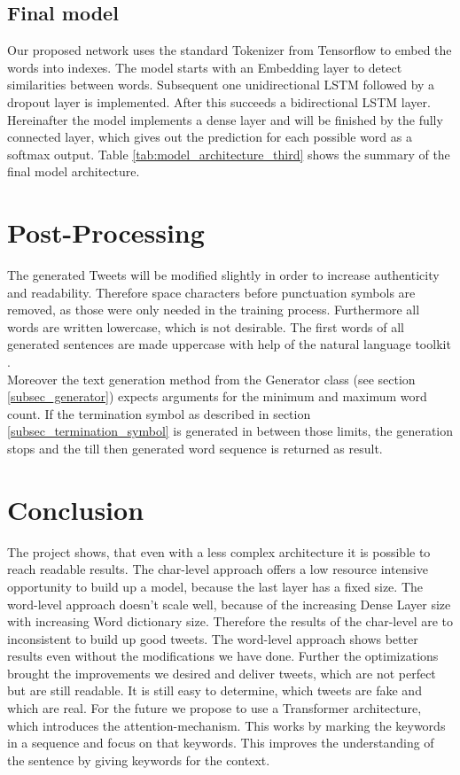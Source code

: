 \documentclass[conference]{IEEEtran}
\begin{document}
\subsection{Final model}

Our proposed network uses the standard Tokenizer from Tensorflow to embed the words into indexes. The model starts with an Embedding layer to detect similarities between words. Subsequent one unidirectional LSTM followed by a dropout layer is implemented. After this succeeds a bidirectional LSTM layer. Hereinafter the model implements a dense layer and will be finished by the fully connected layer, which gives out the prediction for each possible word as a softmax output. Table \ref{tab:model_architecture_third} shows the summary of the final model architecture.

\section{Post-Processing}

The generated Tweets will be modified slightly in order to increase authenticity and readability. Therefore space characters before punctuation symbols are removed, as those were only needed in the training process. Furthermore all words are written lowercase, which is not desirable. The first words of all generated sentences are made uppercase with help of the natural language toolkit \cite{nltk}.\\
Moreover the text generation method from the Generator class (see section \ref{subsec_generator}) expects arguments for the minimum and maximum word count. If the termination symbol as described in section \ref{subsec_termination_symbol} is generated in between those limits, the generation stops and the till then generated word sequence is returned as result.

\section{Conclusion}

The project shows, that even with a less complex architecture it is possible to reach readable results. The char-level approach offers a low resource intensive opportunity to
build up a model, because the last layer has a fixed size. The word-level approach doesn’t scale well, because of the increasing Dense Layer size with increasing Word dictionary size. Therefore the results of the char-level are to inconsistent to build up good tweets. The word-level approach shows better results even without the modifications we have done. Further the optimizations brought the improvements we desired and deliver tweets, which are not perfect but are still readable. It is still easy to determine, which tweets are fake and which are real. For the future we propose to use a Transformer architecture, which introduces the attention-mechanism. This works by marking the keywords in a sequence and focus on that keywords. This improves the understanding of the sentence by giving keywords for the context.
\end{document}

